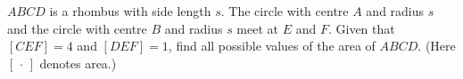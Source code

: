 $ABCD$ is a rhombus with side length $s$. The circle with centre $A$ and radius $s$ and the circle with centre $B$ and radius $s$ meet at $E$ and $F$. Given that $[CEF]=4$ and $[DEF]=1$, find all possible values of the area of $ABCD$. (Here $[\,\cdot\,]$ denotes area.)
